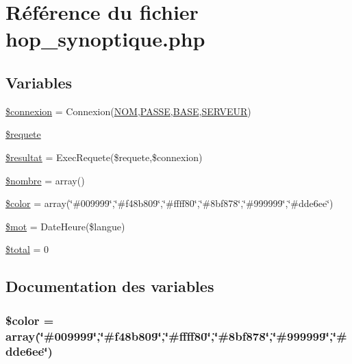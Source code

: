 \hypertarget{hop__synoptique_8php}{
\section{R\'{e}f\'{e}rence du fichier hop\_\-synoptique.php}
\label{hop__synoptique_8php}
}
\subsection*{Variables}
\begin{CompactItemize}
\item 
\hyperlink{hop__synoptique_8php_a0}{\$connexion} = Connexion(\hyperlink{pma__connect_8php_a0}{NOM},\hyperlink{pma__connect_8php_a1}{PASSE},\hyperlink{pma__connect_8php_a3}{BASE},\hyperlink{pma__connect_8php_a2}{SERVEUR})
\item 
\hyperlink{hop__synoptique_8php_a1}{\$requete}
\item 
\hyperlink{hop__synoptique_8php_a2}{\$resultat} = Exec\-Requete(\$requete,\$connexion)
\item 
\hyperlink{hop__synoptique_8php_a3}{\$nombre} = array()
\item 
\hyperlink{hop__synoptique_8php_a4}{\$color} = array(\char`\"{}\#009999\char`\"{},\char`\"{}\#f48b809\char`\"{},\char`\"{}\#ffff80\char`\"{},\char`\"{}\#8bf878\char`\"{},\char`\"{}\#999999\char`\"{},\char`\"{}\#dde6ee\char`\"{})
\item 
\hyperlink{hop__synoptique_8php_a5}{\$mot} = Date\-Heure(\$langue)
\item 
\hyperlink{hop__synoptique_8php_a6}{\$total} = 0
\end{CompactItemize}


\subsection{Documentation des variables}
\hypertarget{hop__synoptique_8php_a4}{
\subsubsection[\$color]{\setlength{\rightskip}{0pt plus 5cm}\$color = array(\char`\"{}\#009999\char`\"{},\char`\"{}\#f48b809\char`\"{},\char`\"{}\#ffff80\char`\"{},\char`\"{}\#8bf878\char`\"{},\char`\"{}\#999999\char`\"{},\char`\"{}\#dde6ee\char`\"{})}}
\label{hop__synoptique_8php_a4}


